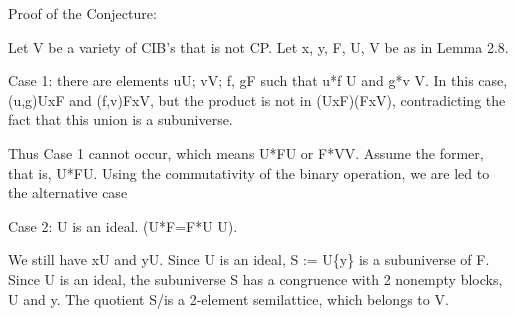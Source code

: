 \begin{thebibliography}{1}
Proof of the Conjecture:

Let V be a variety of CIB's that is not CP.
Let x, y, F, U, V be as in Lemma 2.8.

Case 1:
there are elements u\in U; v\in V; f, g\in F such that
u*f \notin U and g*v \notin V.
In this case, (u,g)\in UxF and (f,v)\in FxV, but the product
is not in (UxF)\cup(FxV), contradicting the fact that this union
is a subuniverse.

Thus Case 1 cannot occur, which means U*F\subseteq U or
F*V\subseteq V. Assume the former, that is, U*F\subseteq U.
Using the commutativity of the binary operation, we are
led to the alternative case

Case 2: U is an ideal. (U*F=F*U \subseteq U).

We still have x\in U and y\notin U. Since U is an ideal,
S := U\cup \{y\} is a subuniverse of F.
Since U is an ideal, the subuniverse S has a congruence
\theta with 2 nonempty blocks, U and {y}.
The quotient S/\theta is a 2-element semilattice,
which belongs to V. \\\\

































\end{thebibliography}
